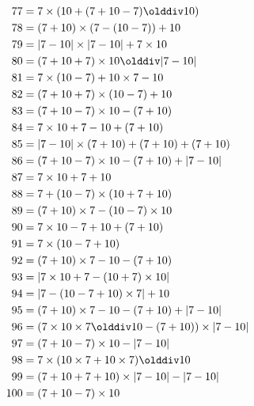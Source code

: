 \begin{align*}
    77  & = 7\times(10+(7+10-7)\olddiv10)                  \\
    78  & = (7+10)\times(7-(10-7))+10                      \\
    79  & = |7-10|\times|7-10|+7\times10                   \\
    80  & = (7+10+7)\times10\olddiv|7-10|                  \\
    81  & = 7\times(10-7)+10\times7-10                     \\
    82  & = (7+10+7)\times(10-7)+10                        \\
    83  & = (7+10-7)\times10-(7+10)                        \\
    84  & = 7\times10+7-10+(7+10)                          \\
    85  & = |7-10|\times(7+10)+(7+10)+(7+10)               \\
    86  & = (7+10-7)\times10-(7+10)+|7-10|                 \\
    87  & = 7\times10+7+10                                 \\
    88  & = 7+(10-7)\times(10+7+10)                        \\
    89  & = (7+10)\times7-(10-7)\times10                   \\
    90  & = 7\times10-7+10+(7+10)                          \\
    91  & = 7\times(10-7+10)                               \\
    92  & = (7+10)\times7-10-(7+10)                        \\
    93  & = |7\times10+7-(10+7)\times10|                   \\
    94  & = |7-(10-7+10)\times7|+10                        \\
    95  & = (7+10)\times7-10-(7+10)+|7-10|                 \\
    96  & = (7\times10\times7\olddiv10-(7+10))\times|7-10| \\
    97  & = (7+10-7)\times10-|7-10|                        \\
    98  & = 7\times(10\times7+10\times7)\olddiv10          \\
    99  & = (7+10+7+10)\times|7-10|-|7-10|                 \\
    100 & = (7+10-7)\times10                               \\
\end{align*}
